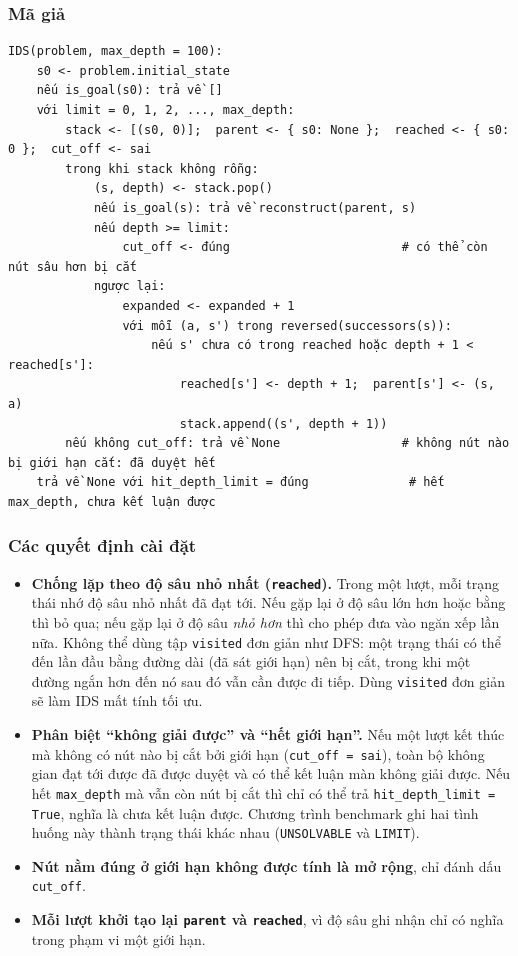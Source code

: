 \subsubsection{Mã giả}

\begin{Verbatim}[breaklines=true, fontsize=\footnotesize, frame=single]
IDS(problem, max_depth = 100):
    s0 <- problem.initial_state
    nếu is_goal(s0): trả về []
    với limit = 0, 1, 2, ..., max_depth:
        stack <- [(s0, 0)];  parent <- { s0: None };  reached <- { s0: 0 };  cut_off <- sai
        trong khi stack không rỗng:
            (s, depth) <- stack.pop()
            nếu is_goal(s): trả về reconstruct(parent, s)
            nếu depth >= limit:
                cut_off <- đúng                        # có thể còn nút sâu hơn bị cắt
            ngược lại:
                expanded <- expanded + 1
                với mỗi (a, s') trong reversed(successors(s)):
                    nếu s' chưa có trong reached hoặc depth + 1 < reached[s']:
                        reached[s'] <- depth + 1;  parent[s'] <- (s, a)
                        stack.append((s', depth + 1))
        nếu không cut_off: trả về None                 # không nút nào bị giới hạn cắt: đã duyệt hết
    trả về None với hit_depth_limit = đúng              # hết max_depth, chưa kết luận được
\end{Verbatim}

\subsubsection{Các quyết định cài đặt}

\begin{itemize}
\item \textbf{Chống lặp theo độ sâu nhỏ nhất (\texttt{reached}).} Trong một lượt, mỗi trạng thái nhớ độ sâu nhỏ nhất đã đạt tới. Nếu gặp lại ở độ sâu lớn hơn hoặc bằng thì bỏ qua; nếu gặp lại ở độ sâu \emph{nhỏ hơn} thì cho phép đưa vào ngăn xếp lần nữa. Không thể dùng tập \texttt{visited} đơn giản như DFS: một trạng thái có thể đến lần đầu bằng đường dài (đã sát giới hạn) nên bị cắt, trong khi một đường ngắn hơn đến nó sau đó vẫn cần được đi tiếp. Dùng \texttt{visited} đơn giản sẽ làm IDS mất tính tối ưu.
\item \textbf{Phân biệt ``không giải được'' và ``hết giới hạn''.} Nếu một lượt kết thúc mà không có nút nào bị cắt bởi giới hạn (\texttt{cut\_\allowbreak{}off = sai}), toàn bộ không gian đạt tới được đã được duyệt và có thể kết luận màn không giải được. Nếu hết \texttt{max\_\allowbreak{}depth} mà vẫn còn nút bị cắt thì chỉ có thể trả \texttt{hit\_\allowbreak{}depth\_\allowbreak{}limit = True}, nghĩa là chưa kết luận được. Chương trình benchmark ghi hai tình huống này thành trạng thái khác nhau (\texttt{UNSOLVABLE} và \texttt{LIMIT}).
\item \textbf{Nút nằm đúng ở giới hạn không được tính là mở rộng}, chỉ đánh dấu \texttt{cut\_\allowbreak{}off}.
\item \textbf{Mỗi lượt khởi tạo lại \texttt{parent} và \texttt{reached}}, vì độ sâu ghi nhận chỉ có nghĩa trong phạm vi một giới hạn.
\end{itemize}


